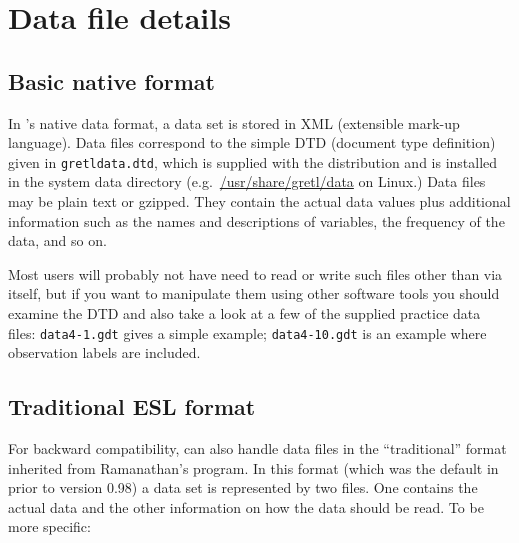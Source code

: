 \chapter{Data file details}
\label{app-datafile}

\section{Basic native format}
\label{native}

In 's native data format, a data set is stored in XML
(extensible mark-up language). Data files correspond to the simple DTD
(document type definition) given in \verb+gretldata.dtd+, which is
supplied with the  distribution and is installed in the
system data directory (e.g.\ \url{/usr/share/gretl/data} on Linux.)
Data files may be plain text or gzipped.  They contain the actual data
values plus additional information such as the names and descriptions
of variables, the frequency of the data, and so on.

Most users will probably not have need to read or write such files
other than via  itself, but if you want to manipulate them
using other software tools you should examine the DTD and also take a
look at a few of the supplied practice data files: \verb+data4-1.gdt+
gives a simple example; \verb+data4-10.gdt+ is an example where
observation labels are included.

\section{Traditional ESL format}
\label{traddata}

For backward compatibility,  can also handle data files in
the ``traditional'' format inherited from Ramanathan's 
program.  In this format (which was the default in  prior
to version 0.98) a data set is represented by two files.  One contains
the actual data and the other information on how the data should be
read.  To be more specific:

